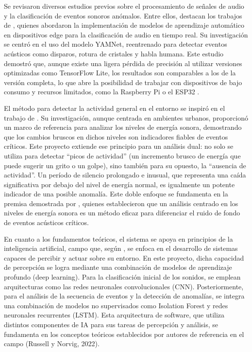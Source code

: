 
Se revisaron diversos estudios previos sobre el procesamiento de señales de audio y la clasificación de eventos sonoros anómalos. Entre ellos, destacan los trabajos de \citeauthor{malmberg_real-time_2021} \citeyear{malmberg_real-time_2021}, quienes abordaron la implementación de modelos de aprendizaje automático en dispositivos edge para la clasificación de audio en tiempo real. Su investigación se centró en el uso del modelo YAMNet, reentrenado para detectar eventos acústicos como disparos, rotura de cristales y habla humana. Este estudio demostró que, aunque existe una ligera pérdida de precisión al utilizar versiones optimizadas como TensorFlow Lite, los resultados son comparables a los de la versión completa, lo que abre la posibilidad de trabajar con dispositivos de bajo consumo y recursos limitados, como la Raspberry Pi o el ESP32 \cite{malmberg_real-time_2021}.

El método para detectar la actividad general en el entorno se inspiró en el trabajo de \citeauthor{torija_metodologia_2018} \citeyear{torija_metodologia_2018}. Su investigación, aunque centrada en ambientes urbanos, proporcionó un marco de referencia para analizar los niveles de energía sonora, demostrando que los cambios bruscos en dichos niveles son indicadores fiables de eventos críticos. Este proyecto extiende ese principio para un análisis dual: no solo se utiliza para detectar ``picos de actividad'' (un incremento brusco de energía que puede sugerir un grito o un golpe), sino también para su opuesto, la ``ausencia de actividad''. Un período de silencio prolongado e inusual, que representa una caída significativa por debajo del nivel de energía normal, es igualmente un potente indicador de una posible anomalía. Este doble enfoque se fundamenta en la premisa demostrada por \citeauthor{torija_metodologia_2018} \citeyear{torija_metodologia_2018}, quienes establecieron que un análisis centrado en los niveles de energía sonora es un método eficaz para diferenciar el ruido de fondo de eventos acústicos críticos.

En cuanto a los fundamentos teóricos, el sistema se apoya en principios de la inteligencia artificial, campo que, según \citeauthor{russell_artificial_2022} \citeyear{russell_artificial_2022}, se enfoca en el desarrollo de sistemas capaces de percibir y actuar sobre su entorno. En este proyecto, dicha capacidad de percepción se logra mediante una combinación de modelos de aprendizaje profundo (deep learning). Para la clasificación inicial de los sonidos, se emplean arquitecturas como las redes neuronales convolucionales (CNN). Posteriormente, para el análisis de la secuencia de eventos y la detección de anomalías, se integra una combinación de modelos no supervisados como Isolation Forest y redes neuronales recurrentes (LSTM). Esta arquitectura de software, que utiliza distintos componentes de IA para sus tareas de percepción y análisis, se fundamenta en los conceptos teóricos establecidos por autores de referencia en el campo (Russell y Norvig, 2022).

